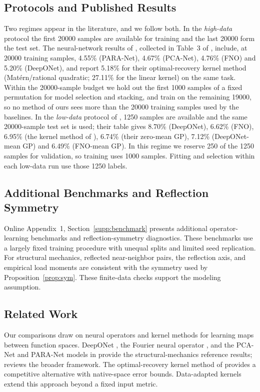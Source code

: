 \documentclass[twoside,11pt]{article}
\begin{document}
\subsection{Protocols and Published Results}
Two regimes appear in the literature, and we follow both. In the
\emph{high-data} protocol the first 20000 samples are available for training
and the last 20000 form the test set. The neural-network results of
\citet{dehoop2022cost}, collected in Table~3 of \citet{batlle2024kernel},
include, at 20000 training samples, 4.55\% (PARA-Net), 4.67\% (PCA-Net), 4.76\% (FNO) and 5.20\%
(DeepONet), and \citet{batlle2024kernel} report 5.18\% for their
optimal-recovery kernel method (Mat\'ern/rational quadratic; 27.11\% for the
linear kernel) on the same task. Within the 20000-sample budget we hold out
the first 1000 samples of a fixed permutation for model selection and
stacking, and train on the remaining 19000, so no method of ours sees more
than the 20000 training samples used by the baselines. In the \emph{low-data}
protocol of \citet{mora2025operator}, 1250 samples are available and the same
20000-sample test set is used; their table gives 8.70\% (DeepONet), 6.62\%
(FNO), 6.95\% (the kernel method of \citealt{batlle2024kernel}), 6.74\% (their
zero-mean GP), 7.12\% (DeepONet-mean GP) and 6.49\% (FNO-mean GP). In this
regime we reserve 250 of the 1250 samples for validation, so
training uses 1000 samples. Fitting and selection within each low-data run
use those 1250 labels.

\subsection{Additional Benchmarks and Reflection Symmetry}
\label{sec:suite-summary}
Online Appendix~1, Section~\ref{supp:benchmark} presents additional operator-learning
benchmarks and reflection-symmetry diagnostics. These benchmarks use a
largely fixed training procedure with unequal splits and limited seed replication.
For structural mechanics, reflected near-neighbor pairs, the reflection
axis, and empirical load moments are consistent with the symmetry used by
Proposition~\ref{prop:sym}. These finite-data checks support the modeling
assumption.

\subsection{Related Work}
\label{sec:related}
Our comparisons draw on neural operators and kernel methods for learning
maps between function spaces. DeepONet \citep{lu2021deeponet}, the Fourier
neural operator \citep{li2021fourier}, and the PCA-Net and PARA-Net models
in \citet{dehoop2022cost} provide the structural-mechanics reference
results; \citet{kovachki2023neural} reviews the broader framework.
The optimal-recovery kernel method of \citet{batlle2024kernel} provides a
competitive alternative with native-space error bounds. Data-adapted
kernels \citep{darcy2023one} extend this approach beyond a fixed input metric.
\end{document}
